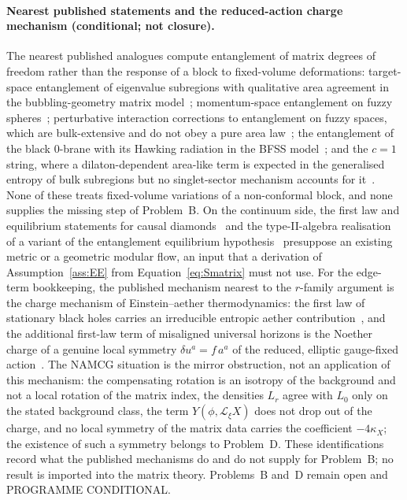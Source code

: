 \paragraph{Nearest published statements and the reduced-action charge mechanism (conditional; not closure).}
The nearest published analogues compute entanglement of matrix degrees of freedom rather than the response of a block to fixed-volume deformations: target-space entanglement of eigenvalue subregions with qualitative area agreement in the bubbling-geometry matrix model~\cite{TsuchiyaYamashiro2022}; momentum-space entanglement on fuzzy spheres~\cite{KawamotoKuroki2021}; perturbative interaction corrections to entanglement on fuzzy spaces, which are bulk-extensive and do not obey a pure area law~\cite{AlloucheDou2026}; the entanglement of the black 0-brane with its Hawking radiation in the BFSS model~\cite{ChoudhuryLaurenzano2024}; and the \(c=1\) string, where a dilaton-dependent area-like term is expected in the generalised entropy of bulk subregions but no singlet-sector mechanism accounts for it~\cite{Craps2026}. None of these treats fixed-volume variations of a non-conformal block, and none supplies the missing step of Problem~B. On the continuum side, the first law and equilibrium statements for causal diamonds~\cite{JacobsonVisser2019,Svesko2019} and the type-II-algebra realisation of a variant of the entanglement equilibrium hypothesis~\cite{JensenSorceSperanza2023} presuppose an existing metric or a geometric modular flow, an input that a derivation of Assumption~\ref{ass:EE} from Equation~\eqref{eq:Smatrix} must not use. For the edge-term bookkeeping, the published mechanism nearest to the \(r\)-family argument is the charge mechanism of Einstein--aether thermodynamics: the first law of stationary black holes carries an irreducible entropic aether contribution~\cite{ArataLiberatiNeri2026}, and the additional first-law term of misaligned universal horizons is the Noether charge of a genuine local symmetry \(\delta u^a=f\,a^a\) of the reduced, elliptic gauge-fixed action~\cite{ArataIsmailLiberati2026}. The NAMCG situation is the mirror obstruction, not an application of this mechanism: the compensating rotation is an isotropy of the background and not a local rotation of the matrix index, the densities \(L_r\) agree with \(L_0\) only on the stated background class, the term \(Y(\phi,\mathcal L_\xi X)\) does not drop out of the charge, and no local symmetry of the matrix data carries the coefficient \(-4\kappa_X\); the existence of such a symmetry belongs to Problem~D. These identifications record what the published mechanisms do and do not supply for Problem~B; no result is imported into the matrix theory. Problems~B and~D remain open and PROGRAMME CONDITIONAL.
